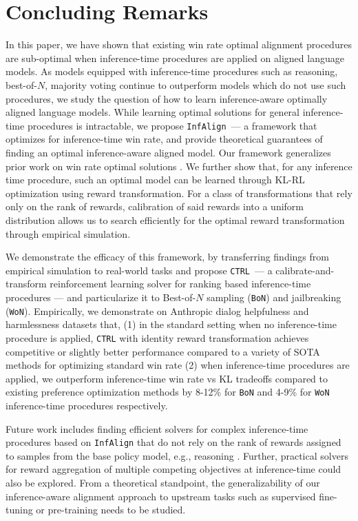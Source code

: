 \documentclass{article}
\newcommand{\iapo}{\texttt{InfAlign}\xspace}
\newcommand{\ctrl}{\texttt{CTRL}\xspace}
\newcommand{\bofn}{\texttt{BoN}\xspace}
\newcommand{\wofn}{\texttt{WoN}\xspace}
\begin{document}
%
%
%
\vspace{-.1in}
\section{Concluding Remarks} 
\label{sec:conclusion}
\vspace{-.1in}
In this paper, we have shown that existing win rate optimal alignment procedures are sub-optimal when inference-time procedures are applied on aligned language models. As models equipped with inference-time procedures such as reasoning, best-of-$N$, majority voting continue to outperform models which do not use such procedures, we study the question of how to learn inference-aware optimally aligned language models. While learning optimal solutions for general inference-time procedures is intractable, we propose \iapo\ --- a framework that optimizes for inference-time win rate, and provide theoretical guarantees of finding an optimal inference-aware aligned model. Our framework generalizes prior work on win rate optimal solutions \citep{azar2023general, gui2024bonbonalignmentlargelanguage}. We further show that, for any inference time procedure, such an optimal model can be learned through KL-RL optimization using reward transformation. For a class of transformations that rely only on the rank of rewards, calibration of said rewards into a uniform distribution allows us to search efficiently for the optimal reward transformation through empirical simulation. 

We demonstrate the efficacy of this framework, by transferring findings from empirical simulation to real-world tasks and propose \ctrl\ --- a calibrate-and-transform reinforcement learning solver for ranking based inference-time procedures --- and particularize it to Best-of-$N$ sampling (\bofn) and jailbreaking (\wofn). Empirically, we demonstrate on Anthropic dialog helpfulness and harmlessness datasets that, (1) in the standard setting when no inference-time procedure is applied, \ctrl with identity reward transformation achieves competitive or slightly better performance compared to a variety of SOTA methods for optimizing standard win rate (2) when inference-time procedures are applied, we outperform inference-time win rate vs KL tradeoffs compared to existing preference optimization methods by 8-12\% for \bofn and 4-9\% for \wofn inference-time procedures respectively. 

Future work includes finding efficient solvers for complex inference-time procedures based on \iapo that do not rely on the rank of rewards assigned to samples from the base policy model, e.g., reasoning \citep{o1,xie2024calibrating}. Further, practical solvers for reward aggregation of multiple competing objectives at inference-time could also be explored. From a theoretical standpoint, the generalizability of our inference-aware alignment approach to upstream tasks such as supervised fine-tuning or pre-training needs to be studied.
\end{document}
